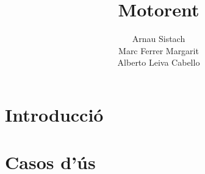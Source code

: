 \documentclass{article}
\title{Motorent}
\author{Arnau Sistach\\Marc Ferrer Margarit \\ Alberto Leiva Cabello}
\begin{document}
\maketitle
\tableofcontents


\section{Introducci\'o}
\section{Casos d'\'us}
\end{document}
